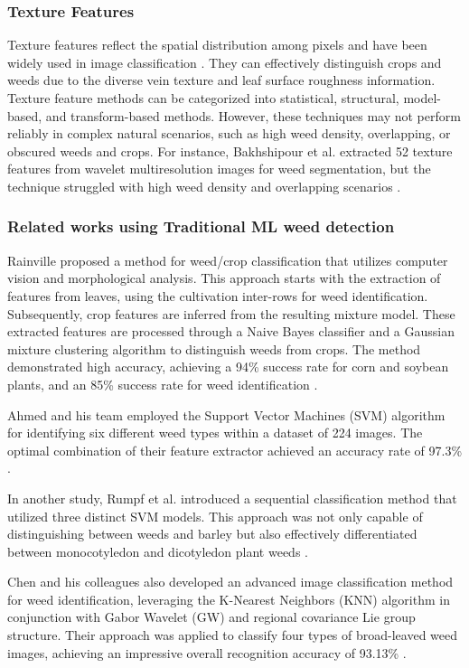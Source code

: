 \documentclass[10pt,twocolumn,letterpaper]{article}
\begin{document}
\subsubsection{Texture Features}
Texture features reflect the spatial distribution among pixels and have been widely used in image classification \cite{Haralick}. They can effectively distinguish crops and weeds due to the diverse vein texture and leaf surface roughness information. Texture feature methods can be categorized into statistical, structural, model-based, and transform-based methods. However, these techniques may not perform reliably in complex natural scenarios, such as high weed density, overlapping, or obscured weeds and crops. For instance, Bakhshipour et al. extracted 52 texture features from wavelet multiresolution images for weed segmentation, but the technique struggled with high weed density and overlapping scenarios \cite{Bakhshipour}.

\subsubsection{Related works using Traditional ML weed detection}
Rainville proposed a method for weed/crop classification that utilizes computer vision and morphological analysis. This approach starts with the extraction of features from leaves, using the cultivation inter-rows for weed identification. Subsequently, crop features are inferred from the resulting mixture model. These extracted features are processed through a Naive Bayes classifier and a Gaussian mixture clustering algorithm to distinguish weeds from crops. The method demonstrated high accuracy, achieving a 94\% success rate for corn and soybean plants, and an 85\% success rate for weed identification \cite{Rainville}.

Ahmed and his team employed the Support Vector Machines (SVM) algorithm for identifying six different weed types within a dataset of 224 images. The optimal combination of their feature extractor achieved an accuracy rate of 97.3\% \cite{Ahmed}.

In another study, Rumpf et al. introduced a sequential classification method that utilized three distinct SVM models. This approach was not only capable of distinguishing between weeds and barley but also effectively differentiated between monocotyledon and dicotyledon plant weeds \cite{Rumpf}.

Chen and his colleagues also developed an advanced image classification method for weed identification, leveraging the K-Nearest Neighbors (KNN) algorithm in conjunction with Gabor Wavelet (GW) and regional covariance Lie group structure. Their approach was applied to classify four types of broad-leaved weed images, achieving an impressive overall recognition accuracy of 93.13\% \cite{Chen}.
\end{document}
